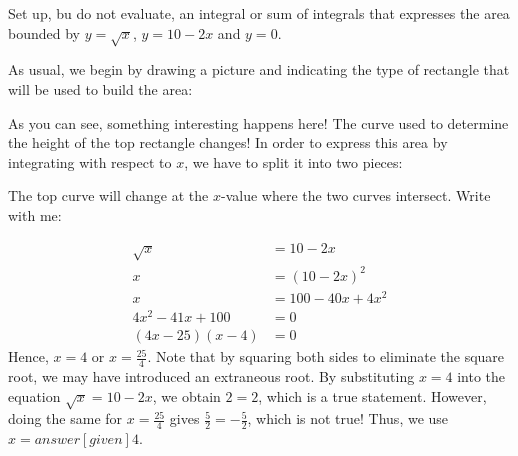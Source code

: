 \documentclass{ximera}
\begin{document}
\begin{example} Set up, bu do not evaluate, an integral or sum of integrals that expresses the area bounded by $y=\sqrt{x}$, $y=10-2x$ and $y=0$.

As usual, we begin by drawing a picture and indicating the type of rectangle that will be used to build the area:

\begin{image}
\end{image}

As you can see, something interesting happens here!  The curve used to determine the height of the top rectangle changes!  In order to express this area by integrating with respect to $x$, we have to split it into two pieces:


The top curve will change at the $x$-value where the two curves intersect.  Write with me:

\begin{align*}
\sqrt{x} &= 10-2x \\
x &= (10-2x)^2 \\
x&= 100-40x+4x^2 \\
4x^2-41x+100 &=0 \\
(4x-25)(x-4) &= 0
\end{align*}
Hence, $x=4$ or $x=\frac{25}{4}$.  Note that by squaring both sides to eliminate the square root, we may have introduced an extraneous root.  By substituting $x=4$ into the equation $\sqrt{x} = 10-2x$, we obtain $2=2$, which is a true statement.  However, doing the same for $x= \frac{25}{4}$ gives $\frac{5}{2} = -\frac{5}{2}$, which is not true!  Thus, we use $x=answer[given]{4}$.  


\end{example}
\end{document}
